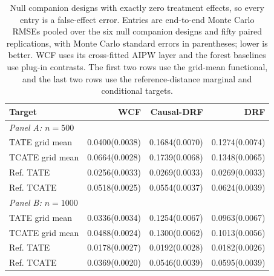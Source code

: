 \begin{table}[!ht]
\centering
\scriptsize
\setlength{\tabcolsep}{3pt}
\caption{Null companion designs with exactly zero treatment effects, so every entry is a false-effect error. Entries are end-to-end Monte Carlo RMSEs pooled over the six null companion designs and fifty paired replications, with Monte Carlo standard errors in parentheses; lower is better. WCF uses its cross-fitted AIPW layer and the forest baselines use plug-in contrasts. The first two rows use the grid-mean functional, and the last two rows use the reference-distance marginal and conditional targets.}
\label{tab:sensitivity-placebo}
\begin{tabular}{lrrr}
\toprule
Target & WCF & Causal-DRF & DRF \\
\midrule
\multicolumn{4}{l}{\textit{Panel A: $n=500$}} \\
\midrule
TATE grid mean & 0.0400(0.0038) & 0.1684(0.0070) & 0.1274(0.0074) \\
TCATE grid mean & 0.0664(0.0028) & 0.1739(0.0068) & 0.1348(0.0065) \\
Ref. TATE & 0.0256(0.0033) & 0.0269(0.0033) & 0.0269(0.0033) \\
Ref. TCATE & 0.0518(0.0025) & 0.0554(0.0037) & 0.0624(0.0039) \\
\multicolumn{4}{l}{\textit{Panel B: $n=1000$}} \\
\midrule
TATE grid mean & 0.0336(0.0034) & 0.1254(0.0067) & 0.0963(0.0067) \\
TCATE grid mean & 0.0488(0.0024) & 0.1300(0.0062) & 0.1013(0.0056) \\
Ref. TATE & 0.0178(0.0027) & 0.0192(0.0028) & 0.0182(0.0026) \\
Ref. TCATE & 0.0369(0.0020) & 0.0546(0.0039) & 0.0595(0.0039) \\
\bottomrule
\end{tabular}
\end{table}
